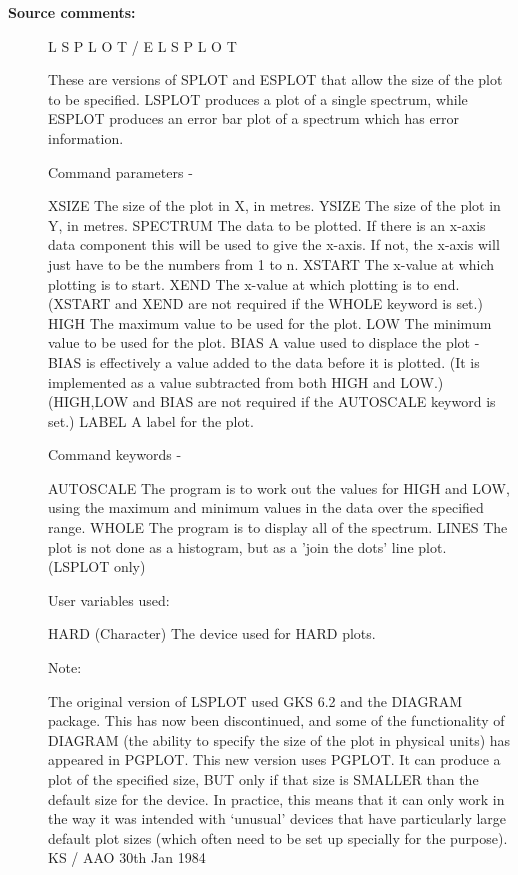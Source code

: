 \begin{description}
\begin{description}
\item [\textbf{Source comments:}]
\begin{terminalv}
 L S P L O T    /    E L S P L O T

 These are versions of SPLOT and ESPLOT that allow the size of
 the plot to be specified.  LSPLOT produces a plot of a single
 spectrum, while ESPLOT produces an error bar plot of a spectrum
 which has error information.

 Command parameters -

 XSIZE       The size of the plot in X, in metres.
 YSIZE       The size of the plot in Y, in metres.
 SPECTRUM    The data to be plotted.  If there
             is an x-axis data component this will be used to
             give the x-axis.  If not, the x-axis will just
             have to be the numbers from 1 to n.
 XSTART      The x-value at which plotting is to start.
 XEND        The x-value at which plotting is to end.
             (XSTART and XEND are not required if the
             WHOLE keyword is set.)
 HIGH        The maximum value to be used for the plot.
 LOW         The minimum value to be used for the plot.
 BIAS        A value used to displace the plot - BIAS is
             effectively a value added to the data before
             it is plotted. (It is implemented as a value
             subtracted from both HIGH and LOW.)
             (HIGH,LOW and BIAS are not required if the
             AUTOSCALE keyword is set.)
 LABEL       A label for the plot.

 Command keywords -

 AUTOSCALE   The program is to work out the values for HIGH
             and LOW, using the maximum and minimum values
             in the data over the specified range.
 WHOLE       The program is to display all of the spectrum.
 LINES       The plot is not done as a histogram, but as
             a 'join the dots' line plot.  (LSPLOT only)

 User variables used:

 HARD        (Character) The device used for HARD plots.

 Note:

 The original version of LSPLOT used GKS 6.2 and the DIAGRAM
 package.  This has now been discontinued, and some of the
 functionality of DIAGRAM (the ability to specify the size of
 the plot in physical units) has appeared in PGPLOT.  This new
 version uses PGPLOT.  It can produce a plot of the specified
 size, BUT only if that size is SMALLER than the default size
 for the device.  In practice, this means that it can only work
 in the way it was intended with `unusual' devices that have
 particularly large default plot sizes (which often need to be set
 up specially for the purpose).
                                     KS / AAO 30th Jan 1984
\end{terminalv}
\end{description}

\end{description}
